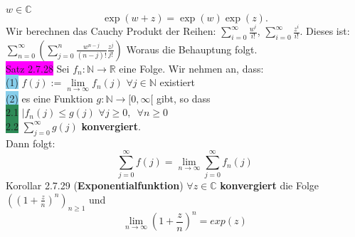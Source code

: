 \documentclass[landscape, 10pt]{article}
\newcommand{\R}{\mathbb{R}}
\newcommand{\N}{\mathbb{N}}
\newcommand{\C}{\mathbb{C}}
\begin{document}
\begin{multicols}{3}
                     \textcolor{NavyBlue}{$w\in\C$}
                     \begin{equation*}
                            \exp(w+z)=\exp(w)\exp(z).                            
                     \end{equation*}
                     Wir berechnen das Cauchy Produkt der 
                     Reihen: \textcolor{NavyBlue}{
                     $\sum_{i=0}^\infty\frac{w^i}{i!}$},
                     \textcolor{NavyBlue}{
                     $\sum_{i=0}^\infty\frac{z^i}{i!}$}.
                     Dieses ist:
                     \textcolor{NavyBlue}{
                     $\sum_{n=0}^\infty(\sum_{j=0}^n
                     \frac{w^{n-j}}{(n-j)!}
                     \frac{z^j}{j!})$} Woraus die Behauptung folgt.\\
              \colorbox{magenta}{Satz 2.7.28} 
                     Sei \textcolor{NavyBlue}{$f_n:\N\longrightarrow\R$} 
                     eine Folge. Wir nehmen an, dass: \\
                     \colorbox{SkyBlue}{(1)} 
                            \textcolor{NavyBlue}{
                            $f(j):=\lim\limits_{n\to\infty}f_n(j)$\quad
                            $\forall j\in\N$} 
                            existiert \\
                     \colorbox{SkyBlue}{(2)} es eine Funktion 
                            \textcolor{NavyBlue}{
                            $g:\N\longrightarrow[0,\infty[$} gibt,
                            so dass \\
                            \colorbox{SeaGreen}{2.1} 
                                   \textcolor{NavyBlue}{
                                   $|f_n(j)\leqslant g(j)$\quad
                                   $\forall j\geqslant0,\enspace
                                   \forall n\geqslant0$} \\
                            \colorbox{SeaGreen}{2.2}
                                   \textcolor{NavyBlue}{$\sum_{j=0}^\infty g(j)$} 
                                   \textbf{konvergiert}. \\
                            Dann folgt: 
                            \begin{equation*}
                                   \sum_{j=0}^\infty f(j)
                                   =\lim\limits_{n\to\infty}
                                   \sum_{j=0}^\infty f_n(j)
                            \end{equation*}
              \colorbox{BurntOrange}{Korollar 2.7.29} 
              (\textbf{Exponentialfunktion})
                     \textcolor{NavyBlue}{
                     $\forall z\in\C$} \textbf{konvergiert} die Folge 
                     \textcolor{NavyBlue}{
                     $((1+\frac{z}{n})^n)_{n\geqslant1}$} und 
                     \begin{equation*}
                            \lim\limits_{n\to\infty}
                            (1+\frac{z}{n})^n=exp(z)
                     \end{equation*}


\end{multicols}
\end{document}
